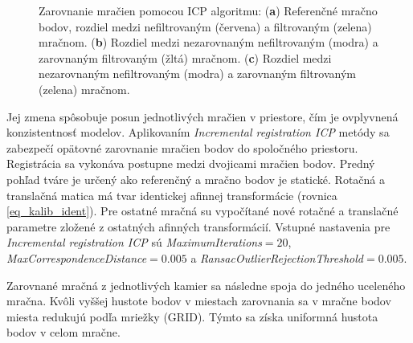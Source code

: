 \begin{figure}[h]
\begin{subfigure}[b]{0.32\textwidth}
		\caption{}
		\label{fig:icp:c}
	\end{subfigure}
	\caption{Zarovnanie mračien pomocou ICP algoritmu: (\textbf{a}) Referenčné mračno bodov, rozdiel medzi nefiltrovaným (červena) a filtrovaným (zelena) mračnom. (\textbf{b}) Rozdiel medzi nezarovnaným nefiltrovaným (modra) a zarovnaným filtrovaným (žltá) mračnom. (\textbf{c}) Rozdiel medzi nezarovnaným nefiltrovaným (modra) a zarovnaným filtrovaným (zelena) mračnom.}
	\label{fig:3dm}
\end{figure}

Jej zmena spôsobuje posun jednotlivých mračien v priestore, čím je ovplyvnená konzistentnosť modelov. Aplikovaním \textit{Incremental registration ICP} metódy sa zabezpečí opätovné zarovnanie mračien bodov do spoločného priestoru. Registrácia sa vykonáva postupne medzi dvojicami mračien bodov. Predný pohľad tváre je určený ako referenčný a mračno bodov je statické. Rotačná a translačná matica má tvar identickej afinnej transformácie (rovnica \ref{eq_kalib_ident}). Pre ostatné mračná su vypočítané nové rotačné a translačné parametre zložené z ostatných afinných transformácií. Vstupné nastavenia pre \textit{Incremental registration ICP} sú \textit{MaximumIterations}$=20$, \textit{MaxCorrespondenceDistance}$=0.005$ a \textit{RansacOutlierRejectionThreshold}$=0.005$. 

Zarovnané mračná z jednotlivých kamier sa následne spoja do jedného uceleného mračna. Kvôli vyššej hustote bodov v miestach zarovnania sa v mračne bodov miesta redukujú podľa mriežky (GRID). Týmto sa získa uniformná hustota bodov v celom mračne. 

